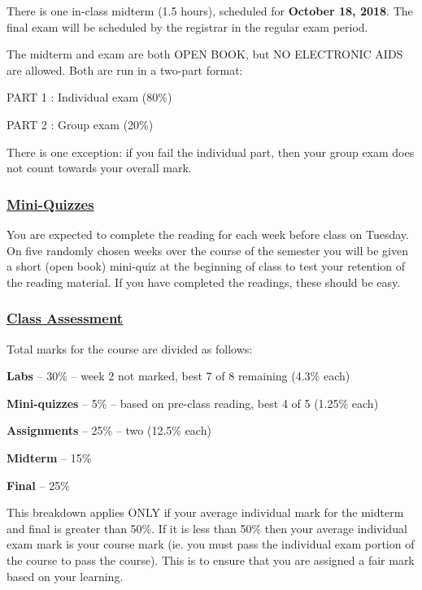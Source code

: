 \documentclass[12pt]{article}
\renewcommand{\section}[1]{\vspace{0pt}\subsubsection*{\underline{\large #1}}\vspace{-10pt}}
\newcounter{lnum}
\newenvironment{abbrevlist}%
  {\begin{list}{ }{\setlength{\leftmargin}{1em}%
               \setlength{\itemindent}{3em}%
               \setlength{\itemsep}{0pt}%
               \setlength{\parsep}{0pt}%
               \setlength{\topsep}{2pt}%
               \usecounter{lnum} } }{\end{list}}
\begin{document}
There is one in-class midterm (1.5 hours), scheduled for {\bf October 18, 2018}. The final exam will be scheduled by the registrar in the regular exam period.

The midterm and exam are both OPEN BOOK, but NO ELECTRONIC AIDS are allowed. Both are run in a two-part format:
\begin{abbrevlist}
\item[PART 1] : Individual exam (80\%)
\item[PART 2] : Group exam (20\%)
\end{abbrevlist}
There is one exception: if you fail the individual part, then your group exam does not count towards your overall mark.


\section{Mini-Quizzes}

You are expected to complete the reading for each week before class on Tuesday. On five randomly chosen weeks over the course of the semester you will be given a short (open book) mini-quiz at the beginning of class to test your retention of the reading material. If you have completed the readings, these should be easy.

\section{Class Assessment}

Total marks for the course are divided as follows:
\begin{abbrevlist}
\item  {\bf Labs} -- 30\% -- week 2 not marked, best 7 of 8 remaining (4.3\% each)
\item {\bf Mini-quizzes} -- 5\% -- based on pre-class reading, best 4 of 5 (1.25\% each)
\item {\bf Assignments} -- 25\% -- two (12.5\% each)
\item {\bf Midterm} -- 15\%
\item {\bf Final} -- 25\%
\end{abbrevlist}

This breakdown applies ONLY if your average individual mark for the midterm
and final is greater than 50\%. If it is less than 50\% then your average individual exam mark is your course
mark (ie. you must pass the individual exam portion of the course to pass the course). This is to ensure that 
you are assigned a fair mark based on your learning.
\end{document}
